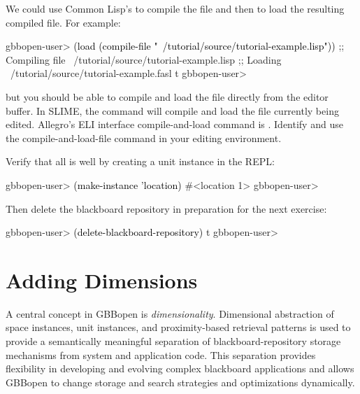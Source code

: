 \documentclass[10pt,twoside,english,pdftex]{article}
\begin{document}
We could use Common Lisp's  to compile the file and
then  to load the resulting compiled file. For example:
%
\W\supp
\begin{example}
\textcolor{darkergray}{%
  gbbopen-user> \textcolor{black}{(load (compile-file "~/tutorial/source/tutorial-example.lisp"))}
  ;; Compiling file ~/tutorial/source/tutorial-example.lisp
  ;; Loading ~/tutorial/source/tutorial-example.fasl
  t
  gbbopen-user>}
\end{example}
%
but you should be able to compile and load the file directly from the editor
buffer.  In SLIME, the command  will compile and load the
file currently being edited.  Allegro's ELI interface compile-and-load command
is .  Identify and use the compile-and-load-file command
in your editing environment.

Verify that all is well by creating a  unit instance in
the REPL:
%
\W\supp
\begin{example}
\textcolor{darkergray}{%
  gbbopen-user> \textcolor{black}{(make-instance 'location)}
  #<location 1>
  gbbopen-user>}
\end{example}

%
Then delete the blackboard repository in preparation for the next exercise:
%
\W\supp
\begin{example}
\textcolor{darkergray}{%
  gbbopen-user> \textcolor{black}{(delete-blackboard-repository)}
  t
  gbbopen-user>}
\end{example}


\T\markright{}%
\T\pagestyle{plain}
\T\cleardoublepage
\W{}
\T\pagestyle{fancy}
\T\thispagestyle{fancybottom}
\T\renewcommand{\headrulewidth}{0pt}
\section{Adding Dimensions}
\label{sec:dimensions}%

A central concept in GBBopen is \textit{dimensionality}.  Dimensional
abstraction of space instances, unit instances, and proximity-based
retrieval patterns is used to provide a semantically meaningful
separation of blackboard-repository storage mechanisms from system and
application code.  This separation provides flexibility in developing
and evolving complex blackboard applications and allows GBBopen to
change storage and search strategies and optimizations dynamically.
\end{document}
